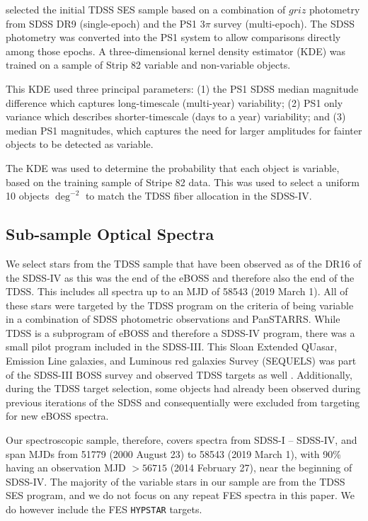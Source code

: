 \documentclass[twocolumn, tighten, astrosymb]{aastex631}
\begin{document}
\citet{Morganson2015} selected the initial TDSS SES sample based on a combination of $griz$ photometry from SDSS DR9 \citep{SDSS_DR9} (single-epoch) and the  PS1 3$\pi$ survey \cite{PS1_1, PS1_2} (multi-epoch). The SDSS photometry was converted into the PS1 system to allow comparisons directly among those epochs. A three-dimensional kernel density estimator (KDE) was trained on a sample of Strip 82 variable and non-variable objects.

This KDE used three principal parameters: (1) the PS1 SDSS median magnitude difference which captures long-timescale (multi-year) variability; (2) PS1 only variance which describes shorter-timescale (days to a year) variability; and (3) median PS1 magnitudes, which captures the need for larger amplitudes for fainter objects to be detected as variable.

The KDE was used to determine the probability that each object is variable, based on the training sample of Stripe 82 data. This was used to select a uniform 10 objects $\deg^{-2}$ to match the TDSS fiber allocation in the SDSS-IV.

\subsection{Sub-sample Optical Spectra}\label{subsec:spectra}

We select stars from the TDSS sample that have been observed as of the DR16 \citep{SDSS_DR16} of the SDSS-IV as this was the end of the eBOSS and therefore also the end of the TDSS. This includes all spectra up to an MJD of 58543 (2019 March 1). All of these stars were targeted by the TDSS program on the criteria of being variable in a combination of SDSS photometric observations and PanSTARRS. While TDSS is a subprogram of eBOSS and therefore a SDSS-IV program, there was a small pilot program included in the SDSS-III. This Sloan Extended QUasar, Emission Line galaxies, and Luminous red galaxies Survey (SEQUELS) was part of the SDSS-III BOSS survey \citep{Dawson2013} and observed TDSS targets as well \citep{Ruan2016}. Additionally, during the TDSS target selection, some objects had already been observed during previous iterations of the SDSS and consequentially were excluded from targeting for new eBOSS spectra. 

Our spectroscopic sample, therefore, covers spectra from SDSS-I -- SDSS-IV, and span MJDs from 51779 (2000 August 23) to 58543 (2019 March 1), with 90\% having an observation MJD $> 56715$ (2014 February 27), near the beginning of SDSS-IV. The majority of the variable stars in our sample are from the TDSS SES program, and we do not focus on any repeat FES spectra in this paper. We do however include the FES \texttt{HYPSTAR} targets.
\end{document}
